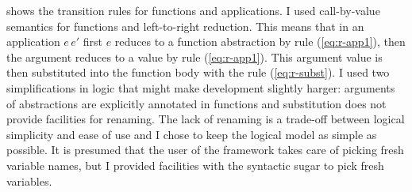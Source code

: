 \documentclass[12pt,twoside,notitlepage]{report}
\theoremstyle{plain}%
\theoremstyle{definition}
\theoremstyle{remark}
\begin{document}
 shows the transition rules for functions and applications. I used call-by-value semantics for functions and left-to-right reduction. This means that in an application $ e\,e' $ first $ e $ reduces to a function abstraction by rule (\ref{eq:r-app1}), then the argument reduces to a value by rule (\ref{eq:r-app1}). This argument value is then substituted into the function body with the rule (\ref{eq:r-subst}). I used two simplifications in logic that might make development slightly harger: arguments of abstractions are explicitly annotated in functions and substitution does not provide facilities for renaming. The lack of renaming is a trade-off between logical simplicity and ease of use and I chose to keep the logical model as simple as possible. It is presumed that the user of the framework takes care of picking fresh variable names, but I provided facilities with the syntactic sugar to pick fresh variables. \label{sec:subst_caveat}
\end{document}
